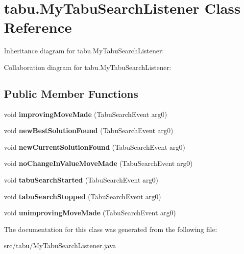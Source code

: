 \hypertarget{classtabu_1_1_my_tabu_search_listener}{}\section{tabu.\+My\+Tabu\+Search\+Listener Class Reference}
\label{classtabu_1_1_my_tabu_search_listener}


Inheritance diagram for tabu.\+My\+Tabu\+Search\+Listener\+:


Collaboration diagram for tabu.\+My\+Tabu\+Search\+Listener\+:
\subsection*{Public Member Functions}
\begin{DoxyCompactItemize}
\item 
void {\bfseries improving\+Move\+Made} (Tabu\+Search\+Event arg0)\hypertarget{classtabu_1_1_my_tabu_search_listener_aeb5bc86f170587e91f0cb03e114888a6}{}\label{classtabu_1_1_my_tabu_search_listener_aeb5bc86f170587e91f0cb03e114888a6}

\item 
void {\bfseries new\+Best\+Solution\+Found} (Tabu\+Search\+Event arg0)\hypertarget{classtabu_1_1_my_tabu_search_listener_a273529680c7b2db1ea8563172e2a296f}{}\label{classtabu_1_1_my_tabu_search_listener_a273529680c7b2db1ea8563172e2a296f}

\item 
void {\bfseries new\+Current\+Solution\+Found} (Tabu\+Search\+Event arg0)\hypertarget{classtabu_1_1_my_tabu_search_listener_a64d90e4f4109875c0431c4fe115f335b}{}\label{classtabu_1_1_my_tabu_search_listener_a64d90e4f4109875c0431c4fe115f335b}

\item 
void {\bfseries no\+Change\+In\+Value\+Move\+Made} (Tabu\+Search\+Event arg0)\hypertarget{classtabu_1_1_my_tabu_search_listener_afbf3b85ee02f0ca7d1609e3df91377a4}{}\label{classtabu_1_1_my_tabu_search_listener_afbf3b85ee02f0ca7d1609e3df91377a4}

\item 
void {\bfseries tabu\+Search\+Started} (Tabu\+Search\+Event arg0)\hypertarget{classtabu_1_1_my_tabu_search_listener_a7688613fe0c9d0797fd346d893acfc28}{}\label{classtabu_1_1_my_tabu_search_listener_a7688613fe0c9d0797fd346d893acfc28}

\item 
void {\bfseries tabu\+Search\+Stopped} (Tabu\+Search\+Event arg0)\hypertarget{classtabu_1_1_my_tabu_search_listener_ad219e246ecff79cb681c2d410c2134c5}{}\label{classtabu_1_1_my_tabu_search_listener_ad219e246ecff79cb681c2d410c2134c5}

\item 
void {\bfseries unimproving\+Move\+Made} (Tabu\+Search\+Event arg0)\hypertarget{classtabu_1_1_my_tabu_search_listener_aa41a8667c3dabae1e64a154c30ef2737}{}\label{classtabu_1_1_my_tabu_search_listener_aa41a8667c3dabae1e64a154c30ef2737}

\end{DoxyCompactItemize}


The documentation for this class was generated from the following file\+:\begin{DoxyCompactItemize}
\item 
src/tabu/My\+Tabu\+Search\+Listener.\+java\end{DoxyCompactItemize}
